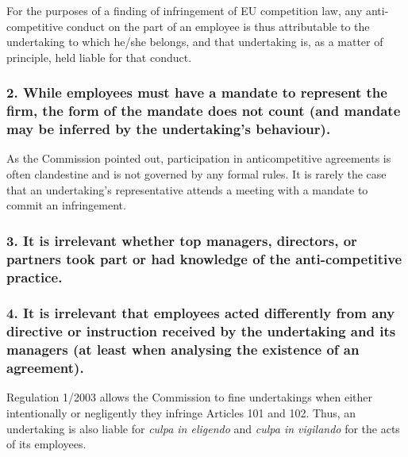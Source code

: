             For the purposes of a finding of infringement of EU competition law, any anti-competitive conduct on the part of an employee is thus attributable to the undertaking to which he/she belongs, and that undertaking is, as a matter of principle, held liable for that conduct.
    
        \subsubsection{2. While employees must have a mandate to represent the firm, the form of the mandate does not count (and mandate may be inferred by the undertaking’s behaviour).}

        
            As the Commission pointed out, participation in anticompetitive agreements is often clandestine and is not governed by any formal rules. It is rarely the case that an undertaking’s representative attends a meeting with a mandate to commit an infringement.
    
        \subsubsection{3. It is irrelevant whether top managers, directors, or partners took part or had knowledge of the anti-competitive practice.}

    
        \subsubsection{4. It is irrelevant that employees acted differently from any directive or instruction received by the undertaking and its managers (at least when analysing the existence of an agreement).}

            Regulation 1/2003 allows the Commission to fine undertakings when either intentionally or negligently they infringe Articles 101 and 102. Thus, an undertaking is also liable for \textit{culpa in eligendo} and \textit{culpa in vigilando} for the acts of its employees.

